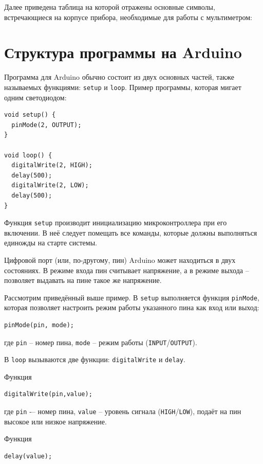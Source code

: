 \documentclass[a4paper,twoside]{book}
\begin{document}
Далее приведена таблица на которой отражены основные символы, встречающиеся на
корпусе прибора, необходимые для работы с мультиметром:

\section{Структура программы на Arduino}

Программа для Arduino обычно состоит из двух основных частей, также называемых
функциями: \texttt{setup} и \texttt{loop}. Пример программы, которая мигает
одним светодиодом:

\begin{verbatim}
void setup() {
  pinMode(2, OUTPUT);
}

void loop() {
  digitalWrite(2, HIGH);
  delay(500);
  digitalWrite(2, LOW);
  delay(500);
}
\end{verbatim}

Функция \texttt{setup} производит инициализацию микроконтроллера при его
включении. В неё следует помещать все команды, которые должны выполняться
единожды на старте системы.

Цифровой порт (или, по-другому, пин) Arduino может находиться в двух состояниях.
В режиме входа пин считывает напряжение, а в режиме выхода – позволяет выдавать
на пине такое же напряжение.

Рассмотрим приведённый выше пример. В \texttt{setup} выполняется функция
\texttt{pinMode}, которая позволяет настроить режим работы указанного пина как
вход или выход:

\begin{verbatim}
pinMode(pin, mode);
\end{verbatim}

где \texttt{pin} -- номер пина, \texttt{mode} -- режим работы
(\texttt{INPUT}/\texttt{OUTPUT}).

В \texttt{loop} вызываются две функции: \texttt{digitalWrite} и \texttt{delay}.

Функция
\begin{verbatim}
digitalWrite(pin,value);
\end{verbatim}

где \texttt{pin} -– номер пина, \texttt{value} -- уровень сигнала
(\texttt{HIGH}/\texttt{LOW}), подаёт на пин высокое или низкое напряжение.

Функция
\begin{verbatim}
delay(value);
\end{verbatim}
\end{document}
